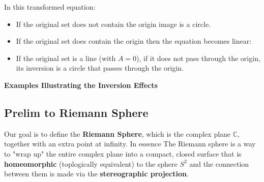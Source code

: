 \documentclass[a4paper, 10pt ]{article} %
\theoremstyle{definition}
\theoremstyle{plain}
\begin{document}
\noindent In this transformed equation:
\begin{itemize}
  \item If the original set does not contain the origin  image is a circle.
  \item If the original set does contain the origin then the equation becomes linear:

  \item If the original set is a line (with \(A=0\)), if it does not pass through the origin, its inversion is a circle that passes through the origin.
\end{itemize}
\noindent\textbf{Examples Illustrating the Inversion Effects} \\
\pagebreak
\subsection{Prelim to Riemann Sphere}
Our goal is to define the  \textbf{Riemann Sphere}, which is the complex plane $\mathbb{C}$, together with an extra point at infinity. In essence
The Riemann sphere is a way to "wrap  up" the entire complex plane into a compact, closed surface that is \textbf{homeomorphic} (toplogically equivalent) to the sphere $S^2$ and the connection between them is made via the \textbf{stereographic projection}.
\end{document}

